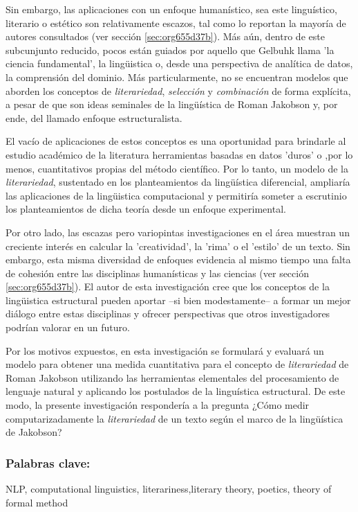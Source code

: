 \documentclass[12pt,letterpaper,twoside]{article}
\begin{document}
Sin embargo, las aplicaciones con un enfoque humanístico, sea este
linguístico, literario o estético son relativamente escazos, tal como
lo reportan la mayoría de autores consultados (ver sección \ref{sec:org655d37b}).  Más aún, dentro de este subcunjunto reducido, pocos
están guiados por aquello que Gelbuhk llama 'la ciencia fundamental',
la lingüistica o, desde una perspectiva de analítica de datos, la
comprensión del dominio. Más particularmente, no se encuentran modelos
que aborden los conceptos de \emph{literariedad}, \emph{selección} y \emph{combinación}
de forma explícita, a pesar de que son ideas seminales de la lingüística
de Roman Jakobson y, por ende, del llamado enfoque estructuralista.

El vacío de aplicaciones de estos conceptos es una oportunidad para
brindarle al estudio académico de la literatura herramientas basadas
en datos 'duros' o ,por lo menos, cuantitativos propias del método
científico. Por lo tanto, un modelo de la \emph{literariedad}, sustentado
en los planteamientos da lingüística diferencial, ampliaría las
aplicaciones de la lingüistica computacional y permitiría someter a
escrutinio los planteamientos de dicha teoría desde un enfoque
experimental.

Por otro lado, las escazas pero variopintas investigaciones en el área
muestran un creciente interés en calcular la 'creatividad', la 'rima'
o el 'estilo' de un texto. Sin embargo, esta misma diversidad de
enfoques evidencia al mismo tiempo una falta de cohesión entre las
disciplinas humanísticas y las ciencias (ver sección \ref{sec:org655d37b}). El autor de esta investigación cree que los conceptos de
la lingüistica estructural pueden aportar --si bien modestamente-- a
formar un mejor diálogo entre estas disciplinas y ofrecer perspectivas
que otros investigadores podrían valorar en un futuro.

Por los motivos expuestos, en esta investigación se formulará y
evaluará un modelo para obtener una medida cuantitativa para el
concepto de \emph{literariedad} de Roman Jakobson utilizando las
herramientas elementales del procesamiento de lenguaje natural y
aplicando los postulados de la linguística estructural. De este modo,
la presente investigación respondería a la pregunta ¿Cómo medir
computarizadamente la \emph{literariedad} de un texto según el marco de la
lingüística de Jakobson?

\subsubsection{\textbf{Palabras clave:}}
\label{sec:orgb848ba0}
NLP, computational linguistics, literariness,literary theory, poetics, theory of formal method
\end{document}
